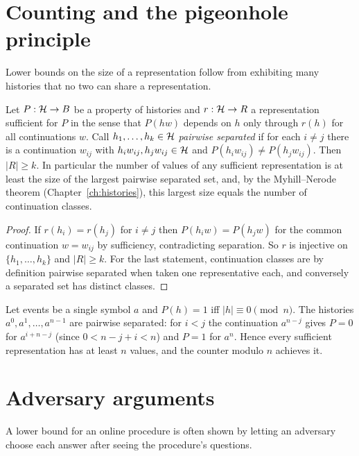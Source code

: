 \section{Counting and the pigeonhole principle}\label{sec:fooling}

Lower bounds on the size of a representation follow from exhibiting many histories that no two can share a representation.

\begin{newresult}\label{pa:fooling}
Let $P:\mathcal{H}\to B$ be a property of histories and $r:\mathcal{H}\to R$ a representation sufficient for $P$ in the sense that $P(hw)$ depends on $h$ only through $r(h)$ for all continuations $w$. Call $h_1,\dots,h_k\in\mathcal{H}$ \emph{pairwise separated} if for each $i\ne j$ there is a continuation $w_{ij}$ with $h_iw_{ij},h_jw_{ij}\in\mathcal{H}$ and $P(h_iw_{ij})\ne P(h_jw_{ij})$. Then $|R|\ge k$. In particular the number of values of any sufficient representation is at least the size of the largest pairwise separated set, and, by the Myhill--Nerode theorem (Chapter~\ref{ch:histories}), this largest size equals the number of continuation classes.
\end{newresult}
\begin{proof}
If $r(h_i)=r(h_j)$ for $i\ne j$ then $P(h_iw)=P(h_jw)$ for the common continuation $w=w_{ij}$ by sufficiency, contradicting separation. So $r$ is injective on $\{h_1,\dots,h_k\}$ and $|R|\ge k$. For the last statement, continuation classes are by definition pairwise separated when taken one representative each, and conversely a separated set has distinct classes.
\end{proof}

\begin{example}[Counting to $n$]\label{pa:ex-count}
Let events be a single symbol $a$ and $P(h)=1$ iff $|h|\equiv0 \pmod n$. The histories $a^0,a^1,\dots,a^{n-1}$ are pairwise separated: for $i<j$ the continuation $a^{n-j}$ gives $P=0$ for $a^{i+n-j}$ (since $0<n-j+i<n$) and $P=1$ for $a^{n}$. Hence every sufficient representation has at least $n$ values, and the counter modulo $n$ achieves it.
\end{example}

\section{Adversary arguments}

A lower bound for an online procedure is often shown by letting an adversary choose each answer after seeing the procedure's questions.

